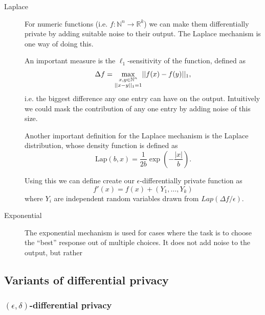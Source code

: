 \documentclass[12pt]{article}
\begin{document}
\begin{description}
    \item[Laplace] For numeric functions (i.e. $f : \mathbb{N}^n \to \mathbb{R}^k$) we can make them differentially private by adding suitable noise to their output. The Laplace mechanism is one way of doing this.
    
    An important measure is the $\ell_1$-sensitivity of the function, defined as
    \begin{equation}
        \Delta f = \underset{\begin{subarray}{c}
            x,y \in \mathbb{N}^{n} \\
            ||x-y||_1 = 1
        \end{subarray}}{\max} || f(x)-f(y) ||_1,
    \end{equation}
    i.e. the biggest difference any one entry can have on the output. Intuitively we could mask the contribution of any one entry by adding noise of this size.
    
    Another important definition for the Laplace mechanism is the Laplace distribution, whose density function is defined as
    \begin{equation}
        \text{Lap}(b,x) = \frac{1}{2b} \exp \left( -\frac{|x|}{b} \right).
    \end{equation}
    
    Using this we can define create our $\epsilon$-differentially private function as
    \begin{equation*}
        f'(x) = f(x) + (Y_1, \dots, Y_k)
    \end{equation*}
    where $Y_i$ are independent random variables drawn from $Lap(\Delta f/\epsilon)$.
    
    \item[Exponential] The exponential mechanism is used for cases where the task is to choose the ``best'' response out of multiple choices. It does not add noise to the output, but rather 
\end{description}

\subsection{Variants of differential privacy}

\subsubsection{$(\epsilon, \delta)$-differential privacy \label{sec:variant_eps_delta}}
\end{document}
